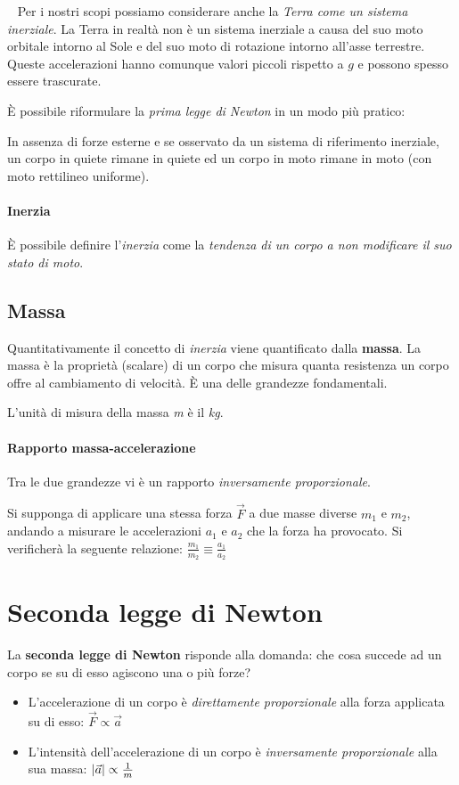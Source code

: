\documentclass[12pt,oneside]{book}
\begin{document}
~\newline
Per i nostri scopi possiamo considerare anche la \emph{Terra come un sistema inerziale}. La Terra in realtà non è un sistema inerziale a causa del suo moto
orbitale intorno al Sole e del suo moto di rotazione intorno all’asse terrestre.
Queste accelerazioni hanno comunque valori piccoli rispetto a $g$ e possono spesso essere trascurate.

\noindent È possibile riformulare la \emph{prima legge di Newton} in un modo più pratico:
\begin{displayquote}
    \centering
    In assenza di forze esterne e se osservato da un sistema di riferimento inerziale, un corpo in quiete rimane in quiete ed un
    corpo in moto rimane in moto (con moto rettilineo uniforme).
\end{displayquote}

\paragraph{Inerzia} È possibile definire l'\emph{inerzia} come la \emph{tendenza di un corpo a non modificare il suo stato di moto}.

\subsection{Massa}
Quantitativamente il concetto di \emph{inerzia} viene quantificato dalla \textbf{massa}. La massa è la proprietà (scalare) di un corpo che misura
quanta resistenza un corpo offre al cambiamento di velocità. È una delle grandezze fondamentali.

L'unità di misura della massa \emph{m} è il \emph{kg}.

\paragraph{Rapporto massa-accelerazione}
Tra le due grandezze vi è un rapporto \emph{inversamente proporzionale}.

Si supponga di applicare una stessa forza $\vec{F}$ a due masse diverse $m_1$ e $m_2$, andando a misurare le accelerazioni $a_1$ e $a_2$ che la forza ha provocato.
Si verificherà la seguente relazione: $\frac{m_1}{m_2} \equiv \frac{a_1}{a_2}$

\newpage
\section{Seconda legge di Newton}
La \textbf{seconda legge di Newton} risponde alla domanda: che cosa succede ad un corpo se su di esso agiscono una o più forze?
\begin{itemize}
    \item L’accelerazione di un corpo è \emph{direttamente proporzionale} alla forza applicata su di esso: $\vec{F} \propto \vec{a}$
    \item L'intensità dell'accelerazione di un corpo è \emph{inversamente proporzionale} alla sua massa: $\abs{\vec{a}} \propto \tfrac{1}{m}$
\end{itemize}
\end{document}
